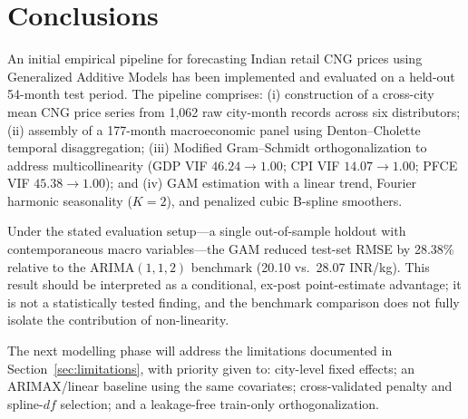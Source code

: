 \documentclass[11pt,a4paper]{article}
\begin{document}
\section{Conclusions}

An initial empirical pipeline for forecasting Indian retail CNG prices using
Generalized Additive Models has been implemented and evaluated on a held-out
54-month test period.  The pipeline comprises: (i) construction of a
cross-city mean CNG price series from 1,062 raw city-month records across six
distributors; (ii) assembly of a 177-month macroeconomic panel using Denton--Cholette
temporal disaggregation; (iii) Modified Gram--Schmidt orthogonalization to
address multicollinearity (GDP VIF $46.24 \to 1.00$; CPI VIF $14.07 \to 1.00$;
PFCE VIF $45.38 \to 1.00$); and (iv) GAM estimation with a linear trend,
Fourier harmonic seasonality ($K=2$), and penalized cubic B-spline smoothers.

Under the stated evaluation setup---a single out-of-sample holdout with
contemporaneous macro variables---the GAM reduced test-set RMSE by 28.38\%
relative to the ARIMA$(1,1,2)$ benchmark (20.10 vs.\ 28.07 INR/kg).  This result
should be interpreted as a conditional, ex-post point-estimate advantage; it is
not a statistically tested finding, and the benchmark comparison does not fully
isolate the contribution of non-linearity.

The next modelling phase will address the limitations documented in
Section~\ref{sec:limitations}, with priority given to: city-level fixed
effects; an ARIMAX/linear baseline using the same covariates; cross-validated
penalty and spline-$df$ selection; and a leakage-free train-only
orthogonalization.
\end{document}
